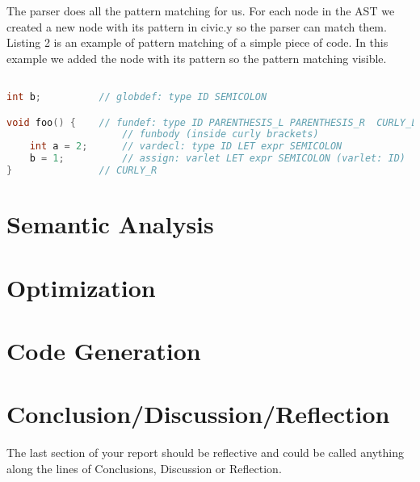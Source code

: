 \documentclass{uva-inf-article}
\begin{document}
The parser does all the pattern matching for us. For each node in the AST we created 
a new node with its pattern in civic.y so the parser can match them. 
Listing 2 is an example of pattern matching of a simple piece of code. In this
example we added the node with its pattern so the pattern matching visible. 

\begin{lstlisting}[basicstyle=\small, language=C, label=lst:code, caption=Pattern matching Example, captionpos=b]

int b;          // globdef: type ID SEMICOLON

void foo() {    // fundef: type ID PARENTHESIS_L PARENTHESIS_R  CURLY_L
                    // funbody (inside curly brackets)
    int a = 2;      // vardecl: type ID LET expr SEMICOLON
    b = 1;          // assign: varlet LET expr SEMICOLON (varlet: ID)
}               // CURLY_R 
\end{lstlisting}


\section{Semantic Analysis}

\section{Optimization}

\section{Code Generation}

\section{Conclusion/Discussion/Reflection}
\par The last section of your report should be reflective and could be called
anything along the lines of Conclusions, Discussion or Reflection. 




\end{document}

